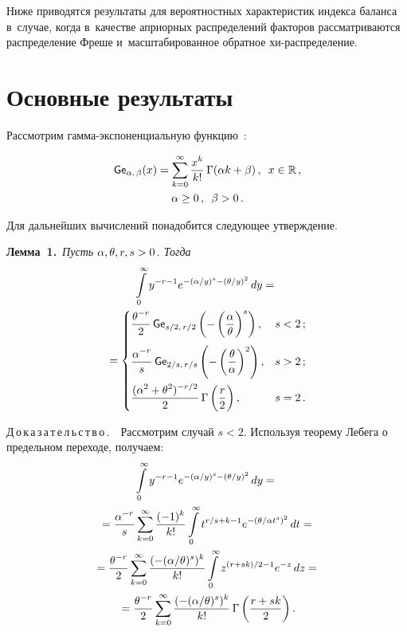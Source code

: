 \begin{multicols}{2}
Ниже приводятся результаты для вероятностных характеристик индекса баланса 
в~случае, когда в~качестве априорных распределений факторов рассматриваются 
распределение Фреше и~масштабированное обратное хи-рас\-пре\-де\-ле\-ние.


\section{Основные результаты}


Рассмотрим гамма-экспоненциальную функцию~\cite{KuTi2017}:

\noindent
\begin{multline*}
{\sf Ge}_{\alpha,\, \beta} (x) = \sum\limits_{k=0}^{\infty}
\displaystyle\frac{\displaystyle x^k\mathstrut}{\displaystyle k!\mathstrut}\, \Gamma(\alpha k 
+ \beta)\,, \enskip x\in\mathbb{R}\,, \\
 \alpha\ge0\,, \enskip \beta> 0\,.
\end{multline*}

Для дальнейших вычислений понадобится следующее утверждение.


\smallskip

\noindent
\textbf{Лемма~1.}\
\textit{Пусть $\alpha,\theta,r,s\hm>0$. Тогда}
\begin{multline*}
\int\limits_0^{\infty}y^{-r-1}e^{-(\alpha/y)^s-(\theta/y)^2} \, dy ={}\\
{}=
 \begin{cases}
   \displaystyle \displaystyle\frac{\displaystyle \theta^{-r}\mathstrut}{\displaystyle 2\mathstrut}\,{\sf Ge}_{s/2,\,r/2}\left(-
\left(
\displaystyle\frac{\displaystyle \alpha\mathstrut}{\displaystyle \theta\mathstrut}\right)^s\right), & s<2\,;\\[12pt]
   \displaystyle \displaystyle\frac{\displaystyle \alpha^{-r}\mathstrut}{\displaystyle s\mathstrut}\,{\sf Ge}_{2/s,\,r/s}\left(-
\left(\displaystyle\frac{\displaystyle \theta\mathstrut}{\displaystyle \alpha\mathstrut}\right)^{2}\right), & s>2\,;\\[12pt]
   \displaystyle \displaystyle\frac{\displaystyle (\alpha^2+\theta^2)^{-r/2}\mathstrut}{\displaystyle 2\mathstrut}\,\Gamma
   \left(\displaystyle\frac{\displaystyle r\mathstrut}{\displaystyle 2\mathstrut}\right), & s = 2\,.
 \end{cases}
\end{multline*}


\noindent
Д\,о\,к\,а\,з\,а\,т\,е\,л\,ь\,с\,т\,в\,о\,.\ \
Рассмотрим случай $s<2$. Используя теорему Лебега о предельном переходе, 
получаем:
\begin{multline*}
\int\limits_0^{\infty}y^{-r-1}e^{-(\alpha/y)^s-(\theta/y)^2} \, dy
={}\\
{}=\displaystyle\frac{\displaystyle \alpha^{-r}\mathstrut}{\displaystyle s\mathstrut} \sum\limits_{k=0}^\infty
\displaystyle\frac{\displaystyle (-1)^k\mathstrut}{\displaystyle k!\mathstrut} \int\limits_0^{\infty} 
t^{r/s+k-1}e^{-(\theta/\alpha t^s)^{2}} \,  dt ={}\\
{}=\displaystyle\frac{\displaystyle \theta^{-r}\mathstrut}{\displaystyle 2\mathstrut}\sum\limits_{k=0}^\infty
\displaystyle\frac{\displaystyle (-(\alpha/\theta)^s)^{k}\mathstrut}{\displaystyle k!\mathstrut}\int\limits_0^{\infty}z^{(r+sk)/2-1}e^{-z} \,  dz ={}\\
{}=
\displaystyle\frac{\displaystyle \theta^{-r}\mathstrut}{\displaystyle 2\mathstrut}\sum\limits_{k=0}^\infty
\displaystyle\frac{\displaystyle (-(\alpha/\theta)^s)^{k}\mathstrut}{\displaystyle k!\mathstrut}\,\Gamma\left(\displaystyle\frac{\displaystyle r+sk\mathstrut}{\displaystyle 2\mathstrut}\right).
\end{multline*}


\end{multicols}
